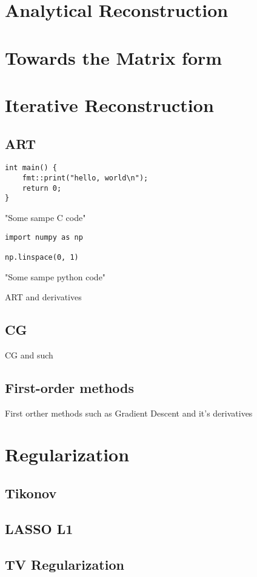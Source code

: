 \section{Analytical Reconstruction}

\section{Towards the Matrix form}

\section{Iterative Reconstruction}

\subsection{ART}

\begin{listing}
	\begin{verbatim}
int main() {
    fmt::print("hello, world\n");
    return 0;
}
    \end{verbatim}
	\caption{"Some sampe C code"}
\end{listing}
\begin{listing}
	\begin{verbatim}
import numpy as np

np.linspace(0, 1)
    \end{verbatim}
	\caption{"Some sampe python code"}
\end{listing}

ART and derivatives

\subsection{CG}

CG and such

\subsection{First-order methods}

First orther methods such as Gradient Descent and it's derivatives

\section{Regularization}

\subsection{Tikonov}

\subsection{LASSO L1}

\subsection{TV Regularization}
